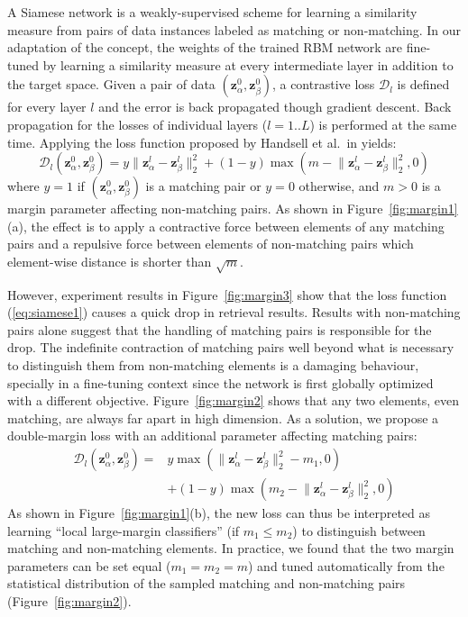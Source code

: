 \documentclass[10pt,twocolumn,letterpaper]{article}
\begin{document}
A Siamese network is a weakly-supervised scheme for learning a similarity measure from pairs of data instances labeled as matching or non-matching.
In our adaptation of the concept, the weights of the trained RBM network are fine-tuned by learning a similarity measure at every intermediate layer in addition to the target space.
Given a pair of data $(\mathbf{z}_\alpha^0,\mathbf{z}_\beta^0)$, a contrastive loss $\mathcal{D}_l$ is defined for every layer $l$ and the error is back propagated though gradient descent.
Back propagation for the losses of individual layers ($l = 1..L$) is performed at the same time.
Applying the loss function proposed by Handsell et al.~in \cite{Siamese} yields:
\begin{equation}
\label{eq:siamese1}
\mathcal{D}_l(\mathbf{z}_\alpha^0,\mathbf{z}_\beta^0) = y \lVert \mathbf{z}_\alpha^l - \mathbf{z}_\beta^l \rVert_2^2 + (1-y) \max(m - \lVert \mathbf{z}_\alpha^l - \mathbf{z}_\beta^l \rVert_2^2, 0)
\end{equation}
where $y=1$ if $(\mathbf{z}_\alpha^0,\mathbf{z}_\beta^0)$ is a matching pair or $y=0$ otherwise, and $m > 0$ is a margin parameter affecting non-matching pairs.
As shown in Figure~\ref{fig:margin1}(a), the effect is to apply a contractive force between elements of any matching pairs and a repulsive force between elements of non-matching pairs which element-wise distance is shorter than $\sqrt{m}$.


However, experiment results in Figure~\ref{fig:margin3} show that the loss function (\ref{eq:siamese1}) causes a quick drop in retrieval results.
Results with non-matching pairs alone suggest that the handling of matching pairs is responsible for the drop.
The indefinite contraction of matching pairs well beyond what is necessary to distinguish them from non-matching elements is a damaging behaviour, specially in a fine-tuning context since the network is first globally optimized with a different objective.
Figure~\ref{fig:margin2} shows that any two elements, even matching, are always far apart in high dimension.
As a solution, we propose a double-margin loss with an additional parameter affecting matching pairs:
\begin{equation}
\label{eq:siamese2}
\begin{split}
\mathcal{D}_l(\mathbf{z}_\alpha^0,\mathbf{z}_\beta^0) = &y \max(\lVert \mathbf{z}_\alpha^l - \mathbf{z}_\beta^l \rVert_2^2 - m_1, 0) \\
&+ (1-y) \max(m_2 - \lVert \mathbf{z}_\alpha^l - \mathbf{z}_\beta^l \rVert_2^2, 0)
\end{split}
\end{equation}
As shown in Figure~\ref{fig:margin1}(b), the new loss can thus be interpreted as learning ``local large-margin classifiers'' (if $m_1 \le m_2$) to distinguish between matching and non-matching elements.
In practice, we found that the two margin parameters can be set equal ($m_1 = m_2 = m$) and tuned automatically from the statistical distribution of the sampled matching and non-matching pairs (Figure~\ref{fig:margin2}).
\end{document}
